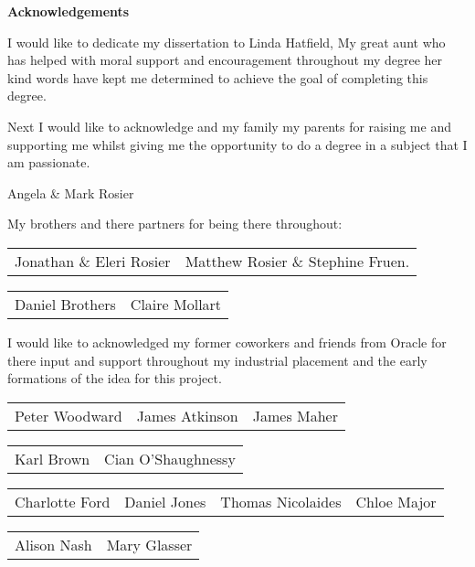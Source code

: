 \thispagestyle{empty}

\begin{center}
{\LARGE\bf Acknowledgements}

I would like to dedicate my dissertation to Linda Hatfield, My great aunt who has helped with moral support and encouragement throughout my degree her kind words have kept me determined to achieve the goal of completing this degree.

Next I would like to acknowledge and my family my parents for raising me and supporting me whilst giving me the opportunity to do a degree in a subject that I am passionate.

Angela \& Mark Rosier

My brothers and there partners for being there throughout:

\begin{tabular}{ l r }
Jonathan \& Eleri Rosier & Matthew Rosier \& Stephine Fruen.\\
\end{tabular}

\begin{tabular}{ l r }
Daniel Brothers & Claire Mollart\\
\end{tabular}

I would like to acknowledged my former coworkers and friends from Oracle for there input and support throughout my industrial placement and the early formations of the idea for this project.

\begin{tabular}{ l c r }
Peter Woodward & James Atkinson & James Maher\\
\end{tabular}

\begin{tabular}{ l r }
Karl Brown & Cian O'Shaughnessy\\
\end{tabular}

\begin{tabular}{ l c c r }
Charlotte Ford & Daniel Jones & Thomas Nicolaides & Chloe Major\\
\end{tabular}


\begin{tabular}{ l r }
Alison Nash & Mary Glasser\\
\end{tabular}


\end{center}
